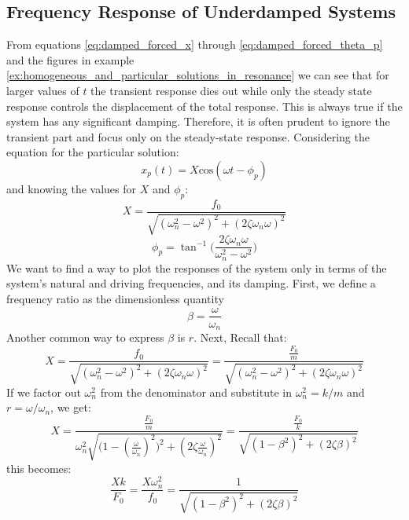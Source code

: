 \documentclass[12pt,letter]{article}
\numberwithin{ex}{section} %
\numberwithin{re}{section} %
\numberwithin{pr}{section} %
\begin{document}
		\subsection{Frequency Response of Underdamped Systems}						
			From equations \ref{eq:damped_forced_x} through \ref{eq:damped_forced_theta_p} and the figures in example \ref{ex:homogeneous_and_particular_solutions_in_resonance} we can see that for larger values of $t$ the transient response dies out while only the steady state response controls the displacement of the total response. This is always true if the system has any significant damping. Therefore, it is often prudent to ignore the transient part and focus only on the steady-state response. Considering the equation for the particular solution: 
			\begin{equation}
				x_p(t) = X \text{cos}(\omega t - \phi_p)
			\end{equation}			 
			and knowing the values for $X$ and $\phi_p$: 
			\begin{equation}
				X = \frac{f_0}{\sqrt{(\omega_n^2 - \omega^2)^2 +  (2\zeta \omega_n \omega)^2}} 
			\end{equation}	
			\begin{equation}
				\phi_p = \tan^{-1} \bigg(\frac{2\zeta \omega_n \omega}{\omega_n^2 - \omega^2}\bigg)
			\end{equation}	
			We want to find a way to plot the responses of the system only in terms of the system's natural and driving frequencies, and its damping. First, we define a frequency ratio as the dimensionless quantity 
			\begin{equation}
				\beta = \frac{\omega}{\omega_n}
			\end{equation}
			Another common way to express $\beta$ is $r$. Next, Recall that:
			\begin{equation}
				X = \frac{f_0}{\sqrt{(\omega_n^2 - \omega^2)^2 +  (2\zeta \omega_n \omega)^2}}  = \frac{\frac{F_0}{m}}{\sqrt{(\omega_n^2 - \omega^2)^2 +  (2\zeta \omega_n \omega)^2}} 
			\end{equation}				
			If we factor out $\omega_n^2$ from the denominator and substitute in $\omega_n^2 = k/m$ and $r = \omega/\omega_n$, we get:
			\begin{equation}
				X = \frac{\frac{F_0}{m}}{\omega_n^2 \sqrt{\big(1 - (\frac{\omega}{\omega_n})^2\big)^2 +  (2\zeta \frac{\omega}{\omega_n})^2}} =  \frac{\frac{F_0}{k}}{\sqrt{(1-\beta^2)^2+(2\zeta \beta)^2}}
			\end{equation}				
			this becomes:
			\begin{equation}
				\frac{Xk}{F_0} = \frac{X \omega_n^2}{f_0} = \frac{1}{\sqrt{(1-\beta^2)^2+(2\zeta \beta)^2}}
			\end{equation}				
\end{document}
